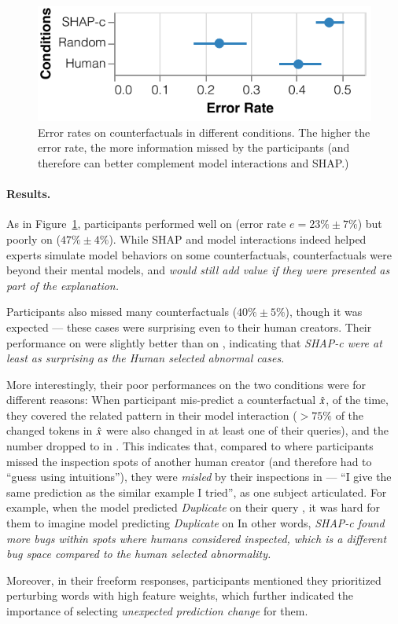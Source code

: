 \begin{figure}[t]
\centering
\includegraphics[width=1\columnwidth]{figures/exp_err_rate}
\vspace{-15pt}
\caption{
Error rates on counterfactuals in different conditions. The higher the error rate, the more information missed by the participants (\ie and therefore can better complement model interactions and SHAP.)
}
\vspace{-10pt}
\label{fig:err_rate}
\end{figure}

\paragraph{Results.}
As in Figure~\ref{fig:err_rate}, participants performed well on \crandom (error rate $e=23\%\pm7\%$) but poorly on \cshap ($47\%\pm 4\%$).
While SHAP and model interactions indeed helped experts simulate model behaviors on some counterfactuals, \cshap counterfactuals were beyond their mental models, and \emph{would still add value if they were presented as part of the explanation.}

Participants also missed many \chuman counterfactuals ($40\%\pm 5\%$), though it was expected --- these cases were surprising even to their human creators.
Their performance on \chuman were slightly better than on \cshap, indicating that \emph{SHAP-c were at least as surprising as the Human selected abnormal cases.}

More interestingly, their poor performances on the two conditions were for different reasons: 
When participant mis-predict a \cshap counterfactual $\hat{x}$,  of the time, they covered the related pattern in their model interaction (\ie $>75\%$ of the changed tokens in $\hat{x}$ were also changed in at least one of their queries), and the number dropped to  in \chuman.
This indicates that, compared to \chuman where participants missed the inspection spots of another human creator (and therefore had to ``guess using intuitions''), they were \emph{misled} by their inspections in \cshap --- ``I give the same prediction as the similar example I tried'', as one subject articulated.
For example, when the model predicted \emph{Duplicate} on their query , it was hard for them to imagine model predicting \emph{Duplicate} on  
In other words, \emph{SHAP-c found more bugs within spots where humans considered inspected, which is a different bug space compared to the human selected abnormality.}

Moreover, in their freeform responses,  participants mentioned they prioritized perturbing words with high feature weights, which further indicated the importance of selecting \emph{unexpected prediction change} for them.



